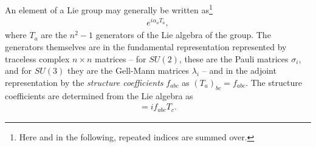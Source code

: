 \documentclass[twoside,english]{uiofysmaster}
\begin{document}
An element of a Lie group may generally be written as\footnote{Here and in the following, repeated indices are summed over.} 
\begin{align}
	e^{i\alpha_a T_a},
\end{align}
where $T_a$ are the $n^2-1$ generators of the Lie algebra of the group. The generators themselves are in the fundamental representation represented by traceless complex $n\times n$ matrices -- for $SU(2)$, these are the Pauli matrices $\sigma_i$, and for $SU(3)$ they are the Gell-Mann matrices $\lambda_i$ -- and in the adjoint representation by the {\it structure coefficients} $f_{abc}$ as $(T_a)_{bc} = f_{abc}$. The structure coefficients are determined from the Lie algebra as
\begin{align}
	[T_a, T_b] = i f_{abc}T_c.
\end{align}
\end{document}
